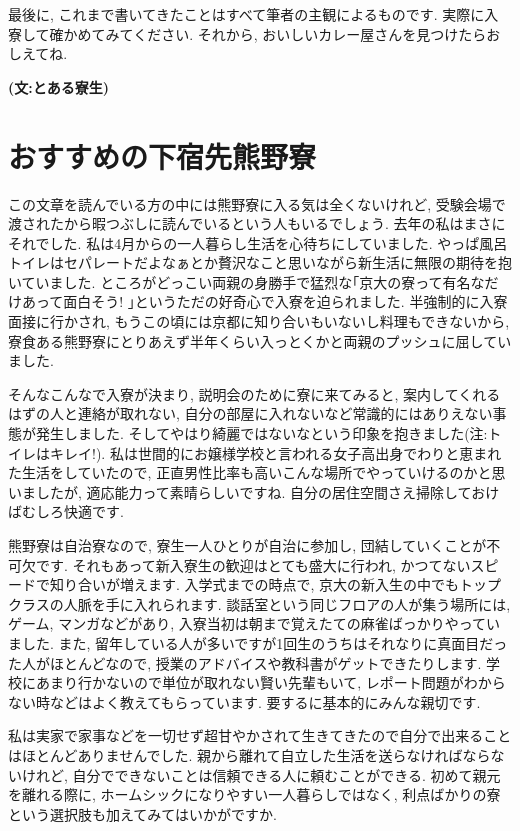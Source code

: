 \documentclass[10pt,b5jsbook,dvips,dvipdfmx,openany]{jsbook}
\theoremstyle{definition}
\begin{document}
		最後に, これまで書いてきたことはすべて筆者の主観によるものです. 実際に入寮して確かめてみてください. それから, おいしいカレー屋さんを見つけたらおしえてね.

{\bf (文:とある寮生)}

		\section{おすすめの下宿先熊野寮}

		この文章を読んでいる方の中には熊野寮に入る気は全くないけれど, 受験会場で渡されたから暇つぶしに読んでいるという人もいるでしょう. 去年の私はまさにそれでした. 私は4月からの一人暮らし生活を心待ちにしていました. やっぱ風呂トイレはセパレートだよなぁとか贅沢なこと思いながら新生活に無限の期待を抱いていました. ところがどっこい両親の身勝手で猛烈な｢京大の寮って有名なだけあって面白そう! ｣というただの好奇心で入寮を迫られました. 半強制的に入寮面接に行かされ, もうこの頃には京都に知り合いもいないし料理もできないから, 寮食ある熊野寮にとりあえず半年くらい入っとくかと両親のプッシュに屈していました.

		そんなこんなで入寮が決まり, 説明会のために寮に来てみると, 案内してくれるはずの人と連絡が取れない, 自分の部屋に入れないなど常識的にはありえない事態が発生しました. そしてやはり綺麗ではないなという印象を抱きました(注:トイレはキレイ!). 私は世間的にお嬢様学校と言われる女子高出身でわりと恵まれた生活をしていたので, 正直男性比率も高いこんな場所でやっていけるのかと思いましたが, 適応能力って素晴らしいですね. 自分の居住空間さえ掃除しておけばむしろ快適です.

		熊野寮は自治寮なので, 寮生一人ひとりが自治に参加し, 団結していくことが不可欠です. それもあって新入寮生の歓迎はとても盛大に行われ, かつてないスピードで知り合いが増えます. 入学式までの時点で, 京大の新入生の中でもトップクラスの人脈を手に入れられます. 談話室という同じフロアの人が集う場所には, ゲーム, マンガなどがあり, 入寮当初は朝まで覚えたての麻雀ばっかりやっていました. また, 留年している人が多いですが1回生のうちはそれなりに真面目だった人がほとんどなので, 授業のアドバイスや教科書がゲットできたりします. 学校にあまり行かないので単位が取れない賢い先輩もいて, レポート問題がわからない時などはよく教えてもらっています. 要するに基本的にみんな親切です.

		私は実家で家事などを一切せず超甘やかされて生きてきたので自分で出来ることはほとんどありませんでした. 親から離れて自立した生活を送らなければならないけれど, 自分でできないことは信頼できる人に頼むことができる. 初めて親元を離れる際に, ホームシックになりやすい一人暮らしではなく, 利点ばかりの寮という選択肢も加えてみてはいかがですか.
\end{document}
